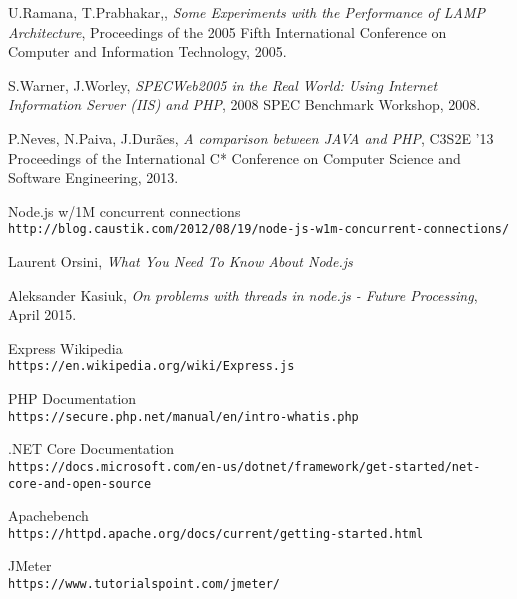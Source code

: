 \begin{thebibliography}{9}
	 U.Ramana, T.Prabhakar,,
	\textit{Some Experiments with the Performance of
		LAMP Architecture}, 
	Proceedings of the 2005 Fifth International
	Conference on Computer and Information Technology, 2005.
	
	 S.Warner, J.Worley,
	\textit{SPECWeb2005 in the Real World: Using Internet
		Information Server (IIS) and PHP}, 
	2008 SPEC Benchmark Workshop,
	2008.
	
	 P.Neves, N.Paiva, J.Durães,
	\textit{A comparison between JAVA and PHP}, 
	C3S2E '13 Proceedings of the International C* Conference on Computer
	Science and Software Engineering, 2013.
	
	Node.js w/1M concurrent connections
	\\\texttt{http://blog.caustik.com/2012/08/19/node-js-w1m-concurrent-connections/}
	
	 Laurent Orsini,
	\textit{What You Need To Know About Node.js}
	
	Aleksander Kasiuk,
	\textit{On problems with threads in node.js - Future Processing},
	April 2015.
	
	Express Wikipedia
	\\\texttt{https://en.wikipedia.org/wiki/Express.js}
	
	PHP Documentation
	\\\texttt{https://secure.php.net/manual/en/intro-whatis.php}
	
	.NET Core Documentation
	\\\texttt{https://docs.microsoft.com/en-us/dotnet/framework/get-started/net-core-and-open-source}
	
	Apachebench
	\\\texttt{https://httpd.apache.org/docs/current/getting-started.html}
	
	JMeter
	\\\texttt{https://www.tutorialspoint.com/jmeter/}

	 
\end{thebibliography}
